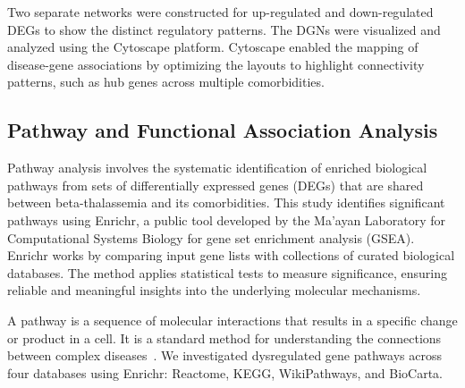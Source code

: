 Two separate networks were constructed for up-regulated and down-regulated DEGs to show the distinct regulatory patterns. The DGNs were visualized and analyzed using the Cytoscape platform. Cytoscape enabled the mapping of disease-gene associations by optimizing the layouts to highlight connectivity patterns, such as hub genes across multiple comorbidities.

\vspace*{-\parskip} %
\subsection{Pathway and Functional Association Analysis}
\label{sec:sec:sec3_4_4}

Pathway analysis involves the systematic identification of enriched biological pathways from sets of differentially expressed genes (DEGs) that are shared between beta-thalassemia and its comorbidities. This study identifies significant pathways using Enrichr, a public tool developed by the Ma'ayan Laboratory for Computational Systems Biology for gene set enrichment analysis (GSEA). Enrichr works by comparing input gene lists with collections of curated biological databases. The method applies statistical tests to measure significance, ensuring reliable and meaningful insights into the underlying molecular mechanisms.

A pathway is a sequence of molecular interactions that results in a specific change or product in a cell. It is a standard method for understanding the connections between complex diseases~\cite{b5}. We investigated dysregulated gene pathways across four databases using Enrichr: Reactome, KEGG, WikiPathways, and BioCarta.

